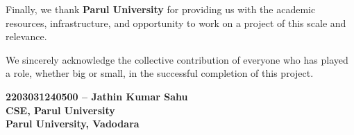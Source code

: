 Finally, we thank \textbf{Parul University} for providing us with the academic resources, infrastructure, and opportunity to work on a project of this scale and relevance.

We sincerely acknowledge the collective contribution of everyone who has played a role, whether big or small, in the successful completion of this project.

\vspace{1cm}

\begin{flushright}
\begin{minipage}{0.55\textwidth}
\raggedleft
\textbf{
2203031240500 – Jathin Kumar Sahu\\[2mm]
CSE, Parul University\\
Parul University, Vadodara
}
\end{minipage}
\end{flushright}

